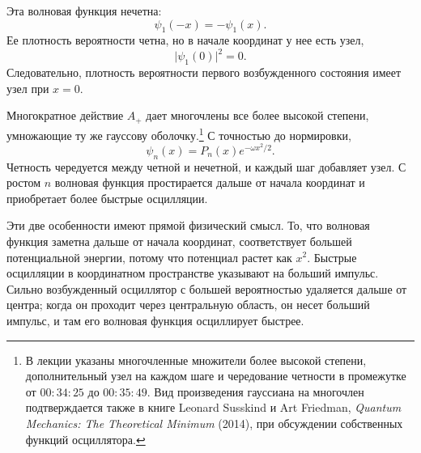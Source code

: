 Эта волновая функция нечетна:
\begin{equation}
\psi_{1}(-x)=-\psi_{1}(x).
\end{equation}
Ее плотность вероятности четна, но в начале координат у нее есть узел,
\begin{equation}
\lvert\psi_{1}(0)\rvert^{2}=0.
\end{equation}
Следовательно, плотность вероятности первого возбужденного состояния имеет узел при \(x=0\).

Многократное действие \(A_{+}\) дает многочлены все более высокой степени, умножающие ту же гауссову оболочку.\footnote{В лекции указаны многочленные множители более высокой степени, дополнительный узел на каждом шаге и чередование четности в промежутке от \(00{:}34{:}25\) до \(00{:}35{:}49\). Вид произведения гауссиана на многочлен подтверждается также в книге Leonard Susskind и Art Friedman, \emph{Quantum Mechanics: The Theoretical Minimum} (2014), при обсуждении собственных функций осциллятора.} С точностью до нормировки,
\begin{equation}
\psi_{n}(x)=P_{n}(x)e^{-\omega x^{2}/2}.
\end{equation}
Четность чередуется между четной и нечетной, и каждый шаг добавляет узел. С ростом \(n\) волновая функция простирается дальше от начала координат и приобретает более быстрые осцилляции.

Эти две особенности имеют прямой физический смысл. То, что волновая функция заметна дальше от начала координат, соответствует большей потенциальной энергии, потому что потенциал растет как \(x^{2}\). Быстрые осцилляции в координатном пространстве указывают на больший импульс. Сильно возбужденный осциллятор с большей вероятностью удаляется дальше от центра; когда он проходит через центральную область, он несет больший импульс, и там его волновая функция осциллирует быстрее.

\begin{classroomqa}
\end{classroomqa}

